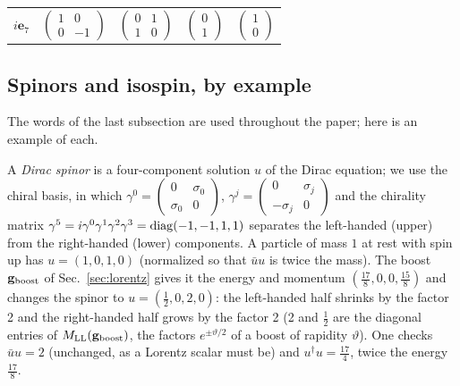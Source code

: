 \documentclass[aps,prd,twocolumn,superscriptaddress,nofootinbib,floatfix,longbibliography]{revtex4-2}
\newcommand{\LL}{{\rm LL}}
\newcommand{\e}[1]{\mathbf e_{#1}}
\begin{document}
\begin{table}[t]
\begin{ruledtabular}
\begin{tabular}{ccccc}
$i\e{7}$ & $\begin{pmatrix}1&0\\0&-1\end{pmatrix}$ & $\begin{pmatrix}0&1\\1&0\end{pmatrix}$ & $\begin{pmatrix}0\\1\end{pmatrix}$ & $\begin{pmatrix}1\\0\end{pmatrix}$\\[3pt]
\end{tabular}
\end{ruledtabular}
\end{table}

\subsection{Spinors and isospin, by example}
\label{sec:spinors}

The words of the last subsection are used throughout the paper; here is an example of each.

A \emph{Dirac spinor} is a four-component solution $u$ of the Dirac equation; we use the chiral basis, in which
$\gamma^0=\left(\begin{smallmatrix}0&\sigma_0\\\sigma_0&0\end{smallmatrix}\right)$,
$\gamma^j=\left(\begin{smallmatrix}0&\sigma_j\\-\sigma_j&0\end{smallmatrix}\right)$ and the chirality matrix
$\gamma^5=i\gamma^0\gamma^1\gamma^2\gamma^3={\rm diag}(-1,-1,1,1)$ separates the left-handed (upper) from the
right-handed (lower) components. A particle of mass $1$ at rest with spin up has $u=(1,0,1,0)$
(normalized so that $\bar uu$ is twice the mass). The boost $\mathbf g_{\rm boost}$ of Sec.~\ref{sec:lorentz} gives it the energy and momentum
$(\tfrac{17}{8},0,0,\tfrac{15}{8})$ and changes the spinor to $u=(\tfrac{1}{2},0,2,0)$: the left-handed half shrinks by the factor 2 and the
right-handed half grows by the factor 2 (2 and $\frac12$ are the diagonal entries of $M_\LL(\mathbf g_{\rm boost})$, the
factors $e^{\pm\vartheta/2}$ of a boost of rapidity $\vartheta$). One checks $\bar uu=2$
(unchanged, as a Lorentz scalar must be) and $u^\dagger u=\tfrac{17}{4}$, twice the energy $\frac{17}8$.
\end{document}
